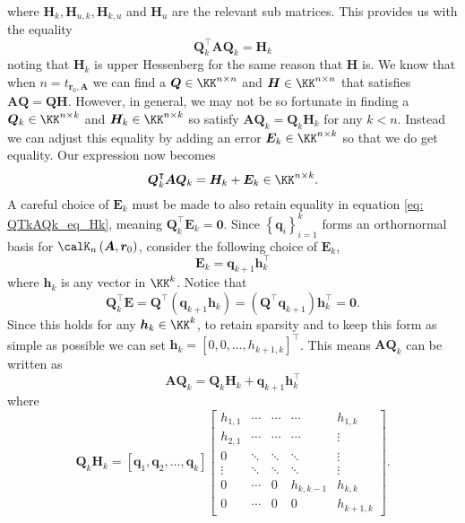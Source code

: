where $\bm{H}_k , \bm{H}_{u,k}, \bm{H}_{k,u}$ and $\bm{H}_u$ are the relevant sub matrices. This provides us with the equality
\begin{equation}\label{eq: QTkAQk_eq_Hk}
    \bm{Q}_{k}^{\intercal} \bm{A} \bm{Q}_{k} = \bm{H}_k
\end{equation}
noting that $\bm{H}_{k}$ is upper Hessenberg for the same reason that $\bm{H}$ is. We know that when $n = t_{\bm{r}_0, \bm{A}}$ we can find a $\bm{Q} \in \KK^{n \times n}$ and $\bm{H} \in \KK^{n \times n}$ that satisfies $\bm{A} \bm{Q} = \bm{Q} \bm{H}$. However, in general, we may not be so fortunate in finding a $\bm{Q}_{k} \in \KK^{n \times k}$ and $\bm{H}_{k} \in \KK^{n \times k}$ so satisfy $\bm{A} \bm{Q}_{k} = \bm{Q}_{k} \bm{H}_k$ for any $k < n$. Instead we can adjust this equality by adding an error $\bm{E}_k \in \KK^{n \times k}$ so that we do get equality. Our expression now becomes
\begin{equation}\label{eq: QTkAQk_eq_HkEk}
    \bm{Q}_{k}^{\intercal} \bm{A} \bm{Q}_{k} = \bm{H}_k + \bm{E}_k \in \KK^{n \times k}.
\end{equation}
A careful choice of $\bm{E}_k$ must be made to also retain equality in equation \ref{eq: QTkAQk_eq_Hk}, meaning $\bm{Q}_{k}^{\intercal} \bm{E}_k = \bm{0}$. Since $\left\{ \bm{q}_i \right\}_{i=1}^{k}$ forms an orthornormal basis for $\calK_{n} \left( \bm{A}, \bm{r}_0 \right)$, consider the following choice of $\bm{E}_k$,
\[
    \bm{E}_k = \bm{q}_{k+1} \bm{h}_{k}^{\intercal}
\]
where $\bm{h}_k$ is any vector in $\KK^{k}$. Notice that
\[
    \bm{Q}_{k}^{\intercal} \bm{E} = \bm{Q}^{\intercal} \left( \bm{q}_{k+1} \bm{h}_k \right) = \left( \bm{Q}^{\intercal} \bm{q}_{k+1} \right) \bm{h}_{k}^{\intercal} = \bm{0}.
\]
Since this holds for any $\bm{h}_k \in \KK^{k}$, to retain sparsity and to keep this form as simple as possible we can set $\bm{h}_k = \left[ 0,0, \ldots , h_{k+1,k} \right]^{\intercal}$. This means $\bm{A} \bm{Q}_k$ can be written as
\begin{equation}\label{eq: QTkAQk_eq_Hk_p_qkhk}
    \bm{A} \bm{Q}_k =  \bm{Q}_k \bm{H}_k + \bm{q}_{k+1} \bm{h}_{k}^{\intercal}
\end{equation}
where
\[
    \bm{Q}_k \bm{H}_k =
    \left[ \bm{q}_1 , \bm{q}_2 , \ldots , \bm{q}_k \right]
    \begin{bmatrix}
        h_{1,1} & \cdots & \cdots & \cdots    & h_{1,k}   \\
        h_{2,1} & \cdots & \cdots & \cdots    & \vdots    \\
        0       & \ddots & \ddots & \ddots    & \vdots    \\
        \vdots  & \ddots & \ddots & \ddots    & \vdots    \\
        0       & \cdots & 0      & h_{k,k-1} & h_{k,k}   \\
        0       & \cdots & 0      & 0         & h_{k+1,k}
    \end{bmatrix}.
\]
